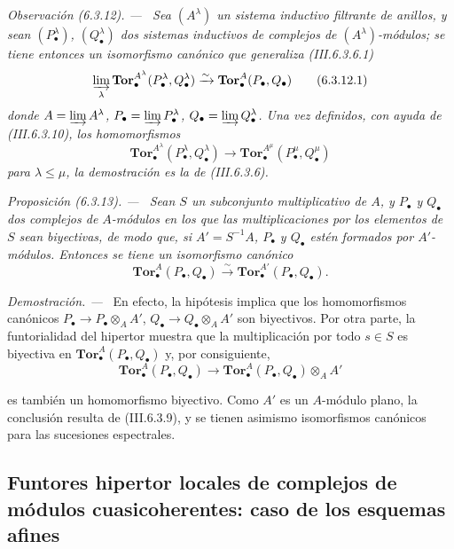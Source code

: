 \documentclass[10pt,oneside]{book}
\newcommand{\sref}[2][]{\textup{(#2)}}
\newcommand{\oldpage}[2][]{\setcounter{footnote}{0}\marginpar{\scriptsize\textbf{#1}~|~#2}\ignorespaces}
\newenvironment{proposition}[1][]{\par\medskip\noindent\itshape Proposición (#1). ---\ }{\par}
\newenvironment{proof}{\par\medskip\noindent\textit{Demostración. ---\ }}{\par}
\newenvironment{namedtheorem}[2][]{\par\medskip\noindent\itshape #2 (#1). ---\ }{\par}
\begin{document}
\begin{namedtheorem}[6.3.12]{Observación}
\label{III.6.3.12}
Sea $(A^\lambda)$ un sistema inductivo filtrante de anillos, y sean
$(P_\bullet^\lambda)$, $(Q_\bullet^\lambda)$ dos sistemas inductivos de
complejos de $(A^\lambda)$-módulos; se tiene entonces un isomorfismo canónico
que generaliza \sref{III.6.3.6.1}
\[
  \varinjlim_\lambda
  \mathbf{Tor}_\bullet^{A^\lambda}
  (P_\bullet^\lambda,Q_\bullet^\lambda)
  \xrightarrow{\sim}
  \mathbf{Tor}_\bullet^A(P_\bullet,Q_\bullet)
  \tag{6.3.12.1}\label{III.6.3.12.1}
\]
donde $A=\varinjlim A^\lambda$, $P_\bullet=\varinjlim P_\bullet^\lambda$,
$Q_\bullet=\varinjlim Q_\bullet^\lambda$. Una vez definidos, con ayuda de
\sref{III.6.3.10}, los homomorfismos
\[
  \mathbf{Tor}_\bullet^{A^\lambda}
  (P_\bullet^\lambda,Q_\bullet^\lambda)
  \longrightarrow
  \mathbf{Tor}_\bullet^{A^\mu}
  (P_\bullet^\mu,Q_\bullet^\mu)
\]
para $\lambda\leqslant\mu$, la demostración es la de \sref{III.6.3.6}.
\end{namedtheorem}

\begin{proposition}[6.3.13]
\label{III.6.3.13}
Sean $S$ un subconjunto multiplicativo de $A$, y $P_\bullet$ y $Q_\bullet$
dos complejos de $A$-módulos en los que las multiplicaciones por los
elementos de $S$ sean biyectivas, de modo que, si $A'=S^{-1}A$,
$P_\bullet$ y $Q_\bullet$ estén formados por $A'$-módulos. Entonces se tiene
un isomorfismo canónico
\[
  \mathbf{Tor}_\bullet^A(P_\bullet,Q_\bullet)
  \xrightarrow{\sim}
  \mathbf{Tor}_\bullet^{A'}(P_\bullet,Q_\bullet).
\]
\end{proposition}

\begin{proof}
En efecto, la hipótesis implica que los homomorfismos canónicos
$P_\bullet\to P_\bullet\otimes_A A'$,
$Q_\bullet\to Q_\bullet\otimes_A A'$ son biyectivos. Por otra parte, la
funtorialidad del hipertor muestra que la multiplicación por todo $s\in S$
es biyectiva en $\mathbf{Tor}_\bullet^A(P_\bullet,Q_\bullet)$ y, por
consiguiente,
\[
  \mathbf{Tor}_\bullet^A(P_\bullet,Q_\bullet)
  \longrightarrow
  \mathbf{Tor}_\bullet^A(P_\bullet,Q_\bullet)\otimes_A A'
\]

\oldpage[III]{146}

es también un homomorfismo biyectivo. Como $A'$ es un $A$-módulo plano, la
conclusión resulta de \sref{III.6.3.9}, y se tienen asimismo isomorfismos
canónicos
para las sucesiones espectrales.
\end{proof}

\subsection{Funtores hipertor locales de complejos de módulos cuasicoherentes: caso de los esquemas afines}
\label{subsection:III.6.4}
\label{III.6.4}
\end{document}
